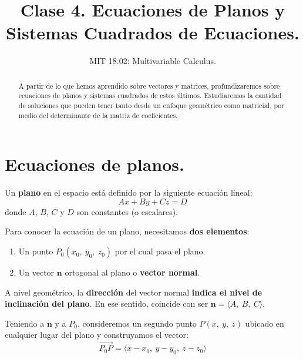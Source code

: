 \documentclass[12pt]{article}
\title{Clase 4. Ecuaciones de Planos y Sistemas Cuadrados de Ecuaciones.}
\author{MIT 18.02: Multivariable Calculus.}
\date{}
\begin{document}
\newcommand{\vecmat}[1]{\mathbf{#1}}                          %
\newcommand{\unitvec}[1]{\vecmat{\hat{#1}}}                   %
\newcommand{\overvec}[1]{\overrightarrow{#1}}                 %
\newcommand{\invmat}[1]{\vecmat{#1}^{-1}}                     %
\newcommand{\transmat}[1]{\vecmat{#1}^{T}}                    %
\newcommand{\Adj}[0]{\text{Adj}}                              %
\newcommand{\R}[0]{\mathbb{R}}                                %

\maketitle

\begin{abstract}
\noindent A partir de lo que hemos aprendido sobre vectores y matrices, profundizaremos sobre ecuaciones de planos y sistemas cuadrados de estos últimos. Estudiaremos la cantidad de soluciones que pueden tener tanto desde un enfoque geométrico como matricial, por medio del determinante de la matriz de coeficientes.
\end{abstract}


\section{Ecuaciones de planos.}

Un \textbf{plano} en el espacio está definido por la siguiente ecuación lineal:
\[
  Ax + By + Cz = D
\]
donde $A$, $B$, $C$ y $D$ son constantes (o escalares).

Para conocer la ecuación de un plano, necesitamos \textbf{dos elementos}:

\begin{enumerate}
\item Un punto $P_{0}(x_{0}, \ y_{0}, \ z_{0})$ por el cual pasa el plano.
\item Un vector $\vecmat{n}$ ortogonal al plano o \textbf{vector normal}.
\end{enumerate}

A nivel geométrico, la \textbf{dirección} del vector normal \textbf{indica el nivel de inclinación del plano}. En ese sentido, coincide con ser $\vecmat{n} = \langle A, \ B, \ C \rangle$.

Teniendo a $\vecmat{n}$ y a $P_{0}$, consideremos un segundo punto $P(x, \ y, \ z)$ ubicado en cualquier lugar del plano y construyamos el vector:
\[
  \overvec{P_{0}P} = \langle x - x_{0}, \ y - y_{0}, \ z - z_{0} \rangle
\]
\end{document}
